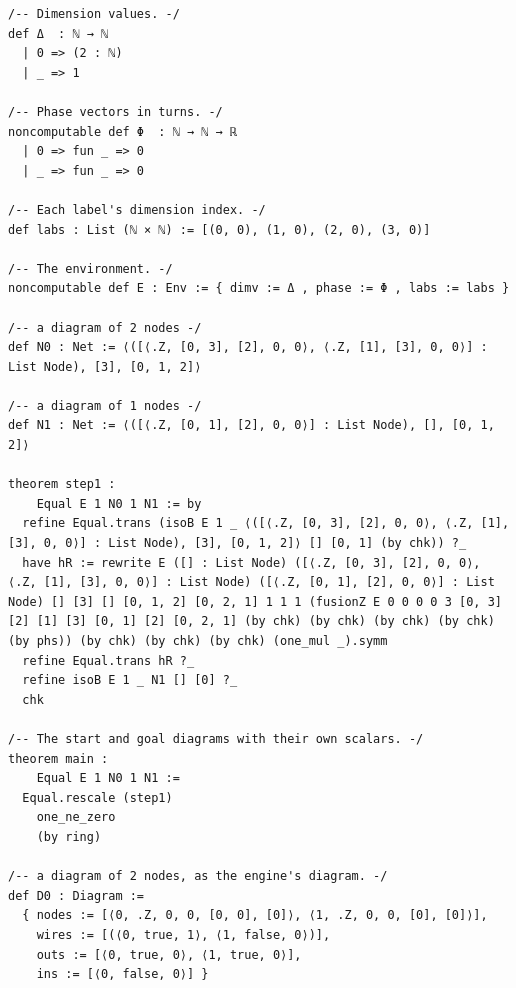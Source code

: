 {\begin{example}
\begin{center}
\end{center}

\begin{lstlisting}[style=leannet]
/-- Dimension values. -/
def Δ  : ℕ → ℕ
  | 0 => (2 : ℕ)
  | _ => 1

/-- Phase vectors in turns. -/
noncomputable def Φ  : ℕ → ℕ → ℝ
  | 0 => fun _ => 0
  | _ => fun _ => 0

/-- Each label's dimension index. -/
def labs : List (ℕ × ℕ) := [(0, 0), (1, 0), (2, 0), (3, 0)]

/-- The environment. -/
noncomputable def E : Env := { dimv := Δ , phase := Φ , labs := labs }

/-- a diagram of 2 nodes -/
def N0 : Net := ⟨([⟨.Z, [0, 3], [2], 0, 0⟩, ⟨.Z, [1], [3], 0, 0⟩] : List Node), [3], [0, 1, 2]⟩

/-- a diagram of 1 nodes -/
def N1 : Net := ⟨([⟨.Z, [0, 1], [2], 0, 0⟩] : List Node), [], [0, 1, 2]⟩

theorem step1 :
    Equal E 1 N0 1 N1 := by
  refine Equal.trans (isoB E 1 _ ⟨([⟨.Z, [0, 3], [2], 0, 0⟩, ⟨.Z, [1], [3], 0, 0⟩] : List Node), [3], [0, 1, 2]⟩ [] [0, 1] (by chk)) ?_
  have hR := rewrite E ([] : List Node) ([⟨.Z, [0, 3], [2], 0, 0⟩, ⟨.Z, [1], [3], 0, 0⟩] : List Node) ([⟨.Z, [0, 1], [2], 0, 0⟩] : List Node) [] [3] [] [0, 1, 2] [0, 2, 1] 1 1 1 (fusionZ E 0 0 0 0 3 [0, 3] [2] [1] [3] [0, 1] [2] [0, 2, 1] (by chk) (by chk) (by chk) (by chk) (by phs)) (by chk) (by chk) (by chk) (one_mul _).symm
  refine Equal.trans hR ?_
  refine isoB E 1 _ N1 [] [0] ?_
  chk

/-- The start and goal diagrams with their own scalars. -/
theorem main :
    Equal E 1 N0 1 N1 :=
  Equal.rescale (step1)
    one_ne_zero
    (by ring)

/-- a diagram of 2 nodes, as the engine's diagram. -/
def D0 : Diagram :=
  { nodes := [⟨0, .Z, 0, 0, [0, 0], [0]⟩, ⟨1, .Z, 0, 0, [0], [0]⟩],
    wires := [(⟨0, true, 1⟩, ⟨1, false, 0⟩)],
    outs := [⟨0, true, 0⟩, ⟨1, true, 0⟩],
    ins := [⟨0, false, 0⟩] }


\end{lstlisting}
\end{example}}
